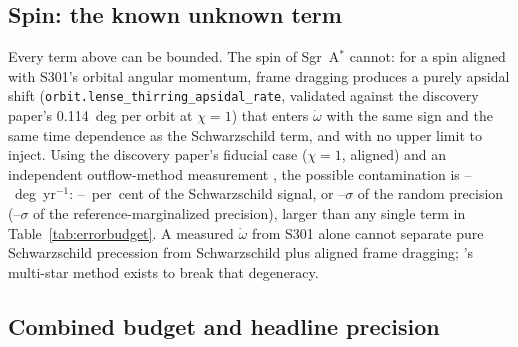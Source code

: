 \documentclass{aastex701}
\begin{document}
\subsection{Spin: the known unknown term}
\label{sec:spincontam}

Every term above can be bounded. The spin of Sgr~A$^*$ cannot: for a spin aligned with S301's orbital angular momentum, frame dragging produces a purely apsidal shift (\texttt{orbit.lense\_thirring\_apsidal\_rate}, validated against the discovery paper's 0.114~deg per orbit at $\chi=1$) that enters $\dot\omega$ with the same sign and the same time dependence as the Schwarzschild term, and with no upper limit to inject. Using the discovery paper's fiducial case ($\chi=1$, aligned) and an independent outflow-method measurement \citep[$\chi=0.90\pm0.06$;][]{daly2024}, the possible contamination is \spinLtRateChiNineZero{}--\spinLtRateChiOneZeroZero{}~deg~yr$^{-1}$: \spinLtPctChiNineZero{}--\spinLtPctChiOneZeroZero{}~per~cent of the Schwarzschild signal, or \spinLtNsigmaNoiseChiNineZero{}--\spinLtNsigmaNoiseChiOneZeroZero{}$\sigma$ of the random precision (\spinLtNsigmaRefChiNineZero{}--\spinLtNsigmaRefChiOneZeroZero{}$\sigma$ of the reference-marginalized precision), larger than any single term in Table~\ref{tab:errorbudget}. A measured $\dot\omega$ from S301 alone cannot separate pure Schwarzschild precession from Schwarzschild plus aligned frame dragging; \citet{piran2026}'s multi-star method exists to break that degeneracy.

\subsection{Combined budget and headline precision}
\label{sec:bottomline}
\end{document}
